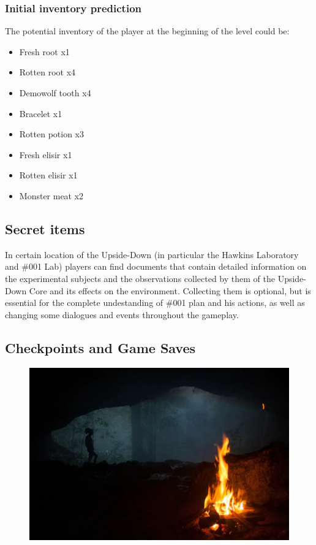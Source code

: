 \subsubsection{Initial inventory prediction}
The potential inventory of the player at the beginning of the level could be:
\begin{itemize}
	\item Fresh root x1
	\item Rotten root x4
	\item Demowolf tooth x4
	\item Bracelet x1
	\item Rotten potion x3
	\item Fresh elisir x1
	\item Rotten elisir x1
	\item Monster meat x2
\end{itemize}

\subsection{Secret items}
In certain location of the Upside-Down (in particular the Hawkins Laboratory and \#001 Lab) players can find documents that contain detailed information on the experimental subjects and the observations collected by them of the Upside-Down Core and its effects on the environment. Collecting them is optional, but is essential for the complete undestanding of \#001 plan and his actions, as well as changing some dialogues and events throughout the gameplay.

\subsection{Checkpoints and Game Saves}

\begin{figure}[H]
	\centering
	\includegraphics[width=14cm]{images/visual_ref/checkpoint.png}
\end{figure}

